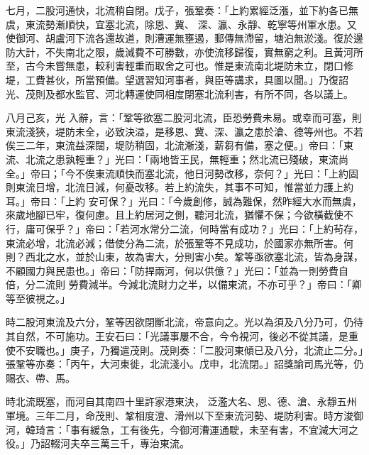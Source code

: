 \begin{pinyinscope}
 七月，二股河通快，北流稍自閉。戊子，張鞏奏：「上約累經泛漲，並下約各已無虞，東流勢漸順快，宜塞北流，除恩、冀、
 深、瀛、永靜、乾寧等州軍水患。又使御河、胡盧河下流各還故道，則漕運無壅遏，郵傳無滯留，塘泊無淤淺。復於邊防大計，不失南北之限，歲減費不可勝數，亦使流移歸復，實無窮之利。且黃河所至，古今未嘗無患，較利害輕重而取舍之可也。惟是東流南北堤防未立，閉口修堤，工費甚伙，所當預備。望選習知河事者，與臣等講求，具圖以聞。」乃復詔光、茂則及都水監官、河北轉運使同相度閉塞北流利害，有所不同，各以議上。



 八月己亥，光
 入辭，言：「鞏等欲塞二股河北流，臣恐勞費未易。或幸而可塞，則東流淺狹，堤防未全，必致決溢，是移恩、冀、深、瀛之患於滄、德等州也。不若俟三二年，東流益深闊，堤防稍固，北流漸淺，薪芻有備，塞之便。」帝曰：「東流、北流之患孰輕重？」光曰：「兩地皆王民，無輕重；然北流已殘破，東流尚全。」帝曰；「今不俟東流順快而塞北流，他日河勢改移，奈何？」光曰：「上約固則東流日增，北流日減，何憂改移。若上約流失，其事不可知，惟當並力護上約耳。」帝曰：「上約
 安可保？」光曰：「今歲創修，誠為難保，然昨經大水而無虞，來歲地腳已牢，復何慮。且上約居河之側，聽河北流，猶懼不保；今欲橫截使不行，庸可保乎？」帝曰：「若河水常分二流，何時當有成功？」光曰：「上約茍存，東流必增，北流必減；借使分為二流，於張鞏等不見成功，於國家亦無所害。何則？西北之水，並於山東，故為害大，分則害小矣。鞏等亟欲塞北流，皆為身謀，不顧國力與民患也。」帝曰：「防捍兩河，何以供億？」光曰：「並為一則勞費自倍，分二流則
 勞費減半。今減北流財力之半，以備東流，不亦可乎？」帝曰：「卿等至彼視之。」



 時二股河東流及六分，鞏等因欲閉斷北流，帝意向之。光以為須及八分乃可，仍待其自然，不可施功。王安石曰：「光議事屢不合，今令視河，後必不從其議，是重使不安職也。」庚子，乃獨遣茂則。茂則奏：「二股河東傾已及八分，北流止二分。」張鞏等亦奏：「丙午，大河東徙，北流淺小。戊申，北流閉。」詔獎諭司馬光等，仍賜衣、帶、馬。



 時北流既塞，而河自其南四十里許家港東決，
 泛濫大名、恩、德、滄、永靜五州軍境。三年二月，命茂則、鞏相度澶、滑州以下至東流河勢、堤防利害。時方浚御河，韓琦言：「事有緩急，工有後先，今御河漕運通駛，未至有害，不宜減大河之役。」乃詔輟河夫卒三萬三千，專治東流。



\end{pinyinscope}